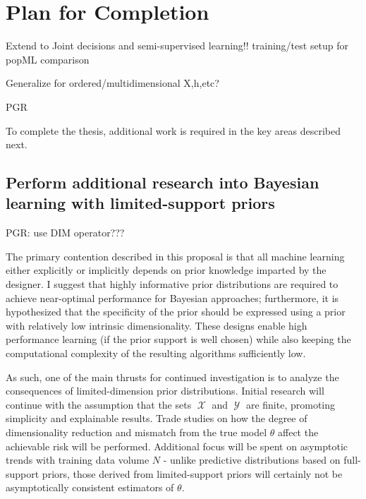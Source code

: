 \documentclass[12pt]{article}
\DeclareMathOperator{\Xcal}{\mathcal{X}}
\DeclareMathOperator{\Ycal}{\mathcal{Y}}
\begin{document}
\newpage
\section{Plan for Completion}


Extend to Joint decisions and semi-supervised learning!! training/test setup for popML comparison

Generalize for ordered/multidimensional X,h,etc?

PGR


To complete the thesis, additional work is required in the key areas described next.

\subsection{Perform additional research into Bayesian learning with limited-support priors}

PGR: use DIM operator???

The primary contention described in this proposal is that all machine learning either explicitly or implicitly depends on prior knowledge imparted by the designer. I suggest that highly informative prior distributions are required to achieve near-optimal performance for Bayesian approaches; furthermore, it is hypothesized that the specificity of the prior should be expressed using a prior with relatively low intrinsic dimensionality. These designs enable high performance learning (if the prior support is well chosen) while also keeping the computational complexity of the resulting algorithms sufficiently low. 

As such, one of the main thrusts for continued investigation is to analyze the consequences of limited-dimension prior distributions. Initial research will continue with the assumption that the sets $\Xcal$ and $\Ycal$ are finite, promoting simplicity and explainable results. Trade studies on how the degree of dimensionality reduction and mismatch from the true model $\theta$ affect the achievable risk will be performed. Additional focus will be spent on asymptotic trends with training data volume $N$ - unlike predictive distributions based on full-support priors, those derived from limited-support priors will certainly not be asymptotically consistent estimators of $\theta$. 
\end{document}
